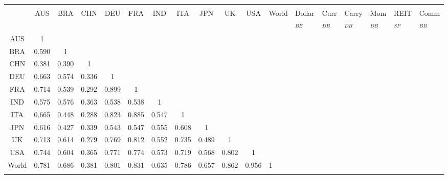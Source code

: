 \begin{adjustbox}{width=\textwidth}
	\begin{tabular}{@{\extracolsep{5pt}} cccccccccccHHHHHHH} 
		\\[-1.8ex]\hline 
		\hline \\[-1.8ex] 
		& AUS & BRA & CHN & DEU & FRA & IND & ITA & JPN & UK & USA & World & Dollar$_{BB}$ & Curr$_{DB}$ & Carry$_{DB}$ & Mom$_{DB}$ & REIT$_{SP}$ & Comm$_{BB}$ \\ 
		\hline \\[-1.8ex] 
		AUS & 1 &  &  &  &  &  &  &  &  &  &  &  &  &  &  &  &  \\ 
		BRA & 0.590 & 1 &  &  &  &  &  &  &  &  &  &  &  &  &  &  &  \\ 
		CHN & 0.381 & 0.390 & 1 &  &  &  &  &  &  &  &  &  &  &  &  &  &  \\ 
		DEU & 0.663 & 0.574 & 0.336 & 1 &  &  &  &  &  &  &  &  &  &  &  &  &  \\ 
		FRA & 0.714 & 0.539 & 0.292 & 0.899 & 1 &  &  &  &  &  &  &  &  &  &  &  &  \\ 
		IND & 0.575 & 0.576 & 0.363 & 0.538 & 0.538 & 1 &  &  &  &  &  &  &  &  &  &  &  \\ 
		ITA & 0.665 & 0.448 & 0.288 & 0.823 & 0.885 & 0.547 & 1 &  &  &  &  &  &  &  &  &  &  \\ 
		JPN & 0.616 & 0.427 & 0.339 & 0.543 & 0.547 & 0.555 & 0.608 & 1 &  &  &  &  &  &  &  &  &  \\ 
		UK & 0.713 & 0.614 & 0.279 & 0.769 & 0.812 & 0.552 & 0.735 & 0.489 & 1 &  &  &  &  &  &  &  &  \\ 
		USA & 0.744 & 0.604 & 0.365 & 0.771 & 0.774 & 0.573 & 0.719 & 0.568 & 0.802 & 1 &  &  &  &  &  &  &  \\ 
		World & 0.781 & 0.686 & 0.381 & 0.801 & 0.831 & 0.635 & 0.786 & 0.657 & 0.862 & 0.956 & 1 &  &  &  &  &  &  \\ 
		\hline \\[-1.8ex] 
	\end{tabular} 
\end{adjustbox}